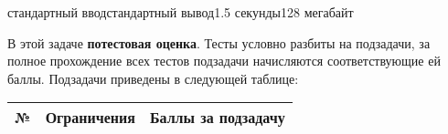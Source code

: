 \begin{problem}{}{стандартный ввод}{стандартный вывод}{1.5 секунды}{128 мегабайт}

%


\InputFile

\OutputFile

\Examples

\begin{example}
\exmp{
}{
}%
\end{example}

\Notes

\Scoring

В этой задаче \textbf{потестовая оценка}. Тесты условно разбиты на подзадачи, за полное прохождение всех тестов подзадачи начисляются соответствующие ей баллы. Подзадачи приведены в следующей таблице:

\medskip

\begin{tabular}{| c | c | c |} \hline
	№ & Ограничения & Баллы за подзадачу \\ \hline
\end{tabular}

\end{problem}

